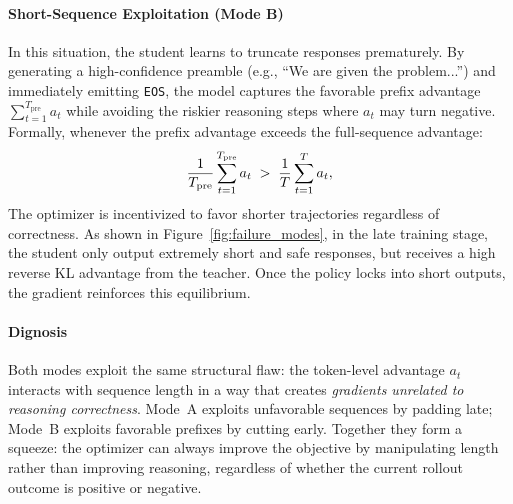 \documentclass[11pt]{article}
\begin{document}




\paragraph{Short-Sequence Exploitation (Mode B)}
In this situation, the student learns to truncate responses prematurely.
By generating a high-confidence preamble (e.g., ``We are given the problem...'') and immediately emitting \texttt{EOS}, the model captures the favorable prefix advantage $\sum_{t=1}^{T_{\text{pre}}} a_t$ while avoiding the riskier reasoning steps where $a_t$ may turn negative.
Formally, whenever the prefix advantage exceeds the full-sequence advantage: 
\begin{equation}
\label{eq:short_hack}
\small
\frac{1}{T_{\text{pre}}}\sum_{t=1}^{T_{\text{pre}}} a_t \;>\; \frac{1}{T}\sum_{t=1}^{T} a_t,
\end{equation}
The optimizer is incentivized to favor shorter trajectories regardless of correctness.
As shown in Figure~\ref{fig:failure_modes}, in the late training stage, the student only output extremely short and safe responses, but receives a high reverse KL advantage from the teacher. 
Once the policy locks into short outputs, the gradient reinforces this equilibrium.



\paragraph{Dignosis}
Both modes exploit the same structural flaw: the token-level advantage $a_t$ interacts with sequence length in a way that creates \emph{gradients unrelated to reasoning correctness}.
Mode~A exploits unfavorable sequences by padding late; Mode~B exploits favorable prefixes by cutting early.
Together they form a squeeze: the optimizer can always improve the objective by manipulating length rather than improving reasoning, regardless of whether the current rollout outcome is positive or negative.
\end{document}
